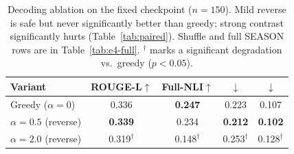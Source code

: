 \begin{table}[!t]
\centering
\caption{Decoding ablation on the fixed \crashlogic{} checkpoint ($n{=}150$). Mild reverse \tcd{} is safe but never significantly better than greedy; strong contrast significantly hurts (Table~\ref{tab:paired}). Shuffle and full SEASON rows are in Table~\ref{tab:e4-full}. $^{\dagger}$ marks a significant degradation vs.\ greedy ($p<0.05$).}
\label{tab:e4}
\small
\setlength{\tabcolsep}{10pt}
\begin{tabular*}{\textwidth}{@{\extracolsep{\fill}}lcccc@{}}
\toprule
\textbf{Variant} & \textbf{ROUGE-L}$\uparrow$ & \textbf{Full-NLI}$\uparrow$ & \textbf{\Hcost{}}$\downarrow$ & \textbf{\Ocost{}}$\downarrow$ \\
\midrule
Greedy ($\alpha{=}0$)           & 0.336 & \textbf{0.247} & 0.223 & 0.107 \\
\tcd{} $\alpha{=}0.5$ (reverse) & \textbf{0.339} & 0.234 & \textbf{0.212} & \textbf{0.102} \\
\tcd{} $\alpha{=}2.0$ (reverse) & 0.319$^{\dagger}$ & 0.148$^{\dagger}$ & 0.253$^{\dagger}$ & 0.128$^{\dagger}$ \\
\bottomrule
\end{tabular*}
\end{table}
